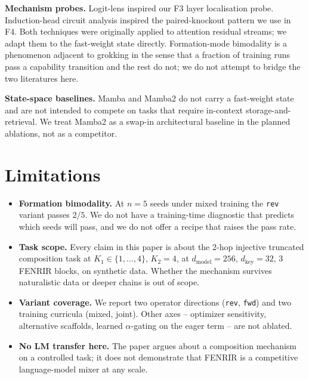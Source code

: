 \documentclass[11pt]{article}
\begin{document}
\textbf{Mechanism probes.} Logit-lens
\citep{nostalgebraist2020logitlens} inspired our F3 layer
localisation probe. Induction-head circuit analysis
\citep{olsson2022incontext} inspired the paired-knockout pattern we
use in F4. Both techniques were originally applied to attention
residual streams; we adapt them to the fast-weight state directly.
Formation-mode bimodality is a phenomenon adjacent to grokking
\citep{wang2024grokked} in the sense that a fraction of training
runs pass a capability transition and the rest do not; we do not
attempt to bridge the two literatures here.

\textbf{State-space baselines.} Mamba and Mamba2
\citep{gu2023mamba,dao2024mamba2} do not carry a fast-weight state
and are not intended to compete on tasks that require
in-context storage-and-retrieval. We treat Mamba2 as a swap-in
architectural baseline in the planned ablations, not as a competitor.

\section{Limitations}
\label{sec:limitations}

\begin{itemize}
\item \textbf{Formation bimodality.} At $n = 5$ seeds under mixed
      training the \texttt{rev} variant passes $2/5$. We do not have a
      training-time diagnostic that predicts which seeds will pass, and
      we do not offer a recipe that raises the pass rate.
\item \textbf{Task scope.} Every claim in this paper is about the 2-hop
      injective truncated composition task at $K_1 \in \{1,\dots,4\}$,
      $K_2 = 4$, at $d_{\text{model}} = 256$, $d_{\text{key}} = 32$,
      $3$ FENRIR blocks, on synthetic data. Whether the mechanism
      survives naturalistic data or deeper chains is out of scope.
\item \textbf{Variant coverage.} We report two operator directions
      (\texttt{rev}, \texttt{fwd}) and two training curricula (mixed,
      joint). Other axes -- optimizer sensitivity, alternative
      scaffolds, learned $\alpha$-gating on the eager term -- are not
      ablated.
\item \textbf{No LM transfer here.} The paper argues about a
      composition mechanism on a controlled task; it does not
      demonstrate that FENRIR is a competitive language-model mixer at
      any scale.
\end{itemize}
\end{document}
